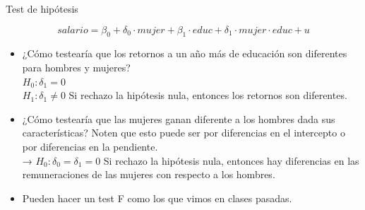 \documentclass{beamer}
\begin{document}
\begin{frame}{Test de hipótesis}

    \[
    salario = \beta_0 + \delta_0 \cdot mujer + \beta_1 \cdot educ + \delta_1 \cdot mujer \cdot educ + u
    \]

\begin{itemize}
    \item ¿Cómo testearía que los retornos a un año más de educación son diferentes para hombres y mujeres? \\
    \(H_0: \delta_1 = 0\)\\
    \(H_1: \delta_1 \neq 0\) Si rechazo la hipótesis nula, entonces los retornos son diferentes.
\end{itemize}

\begin{itemize}
    \item ¿Cómo testearía que las mujeres ganan diferente a los hombres dada sus características? Noten que esto puede ser por diferencias en el intercepto o por diferencias en la pendiente. \\
→ \(H_0: \delta_0 = \delta_1 = 0\)
Si rechazo la hipótesis nula, entonces hay diferencias en las remuneraciones de las mujeres con respecto a los hombres.

\end{itemize}

\begin{itemize}
    \item Pueden hacer un test F como los que vimos en clases pasadas.
\end{itemize}
\end{frame}
\end{document}
